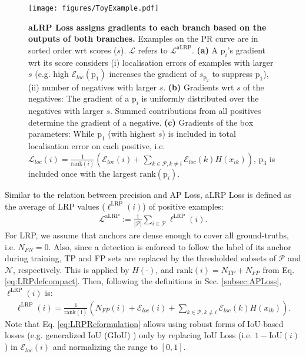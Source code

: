\documentclass{article}
\begin{document}
\begin{figure}[t]
    \centerline{
        \texttt{[image: figures/ToyExample.pdf]}
    }
    \caption{\textbf{aLRP Loss assigns gradients to each branch based on the outputs of both branches.} Examples on the PR curve are in sorted order wrt scores ($s$). $\mathcal{L}$ refers to $\mathcal{L}^\mathrm{aLRP}$. \textbf{(a)} A $\mathrm{p}_i$'s gradient wrt its score considers (i) localisation errors of  examples with larger $s$ (e.g. high $\mathcal{E}_{loc}(\mathrm{p_1})$ increases the gradient of $s_{\mathrm{p_2}}$ to suppress  $\mathrm{p_1}$), (ii) number of negatives with larger $s$. \textbf{(b)} Gradients wrt $s$ of the negatives: The gradient of a $\mathrm{p}_i$ is uniformly distributed over the negatives with larger $s$. Summed  contributions from all positives determine the gradient of a negative. \textbf{(c)} Gradients of the box parameters: While $\mathrm{p_1}$ (with highest $s$) is included in total localisation error on each positive, i.e. $\mathcal{L}_{loc}(i)=\frac{1}{\mathrm{rank}(i)} (  \mathcal{E}_{loc}(i) +\sum \limits_{k \in \mathcal{P}, k \neq i}  \mathcal{E}_{loc}(k) H(x_{ik}))$,  $\mathrm{p_3}$ is included once with the largest $\mathrm{rank}(\mathrm{p}_i)$.
    \label{fig:ToyExample}
} 
\end{figure}

Similar to the relation between precision and AP Loss, aLRP Loss is defined as the average of LRP values ($\ell^{\mathrm{LRP}}(i)$) of positive examples:
\begin{align}
\label{eq:aLRPLoss}
    \mathcal{L}^\mathrm{aLRP}:=\frac{1}{|\mathcal{P}|}\sum \limits_{i \in \mathcal{P}} \ell^{\mathrm{LRP}}(i) 
.
\end{align}
For LRP, we assume that anchors are dense enough to cover all ground-truths, i.e. $N_{FN}=0$. Also, since a detection is enforced to follow the label of its anchor during training, TP and FP sets are replaced by the thresholded subsets of $\mathcal{P}$ and $\mathcal{N}$,  respectively. This is applied by $H(\cdot)$, and $\mathrm{rank}(i)=N_{TP}+N_{FP}$ from Eq. \eqref{eq:LRPdefcompact}. Then, following the definitions in Sec. \ref{subsec:APLoss}, $\ell^{\mathrm{LRP}}(i)$ is:
\begin{align}
\label{eq:LRPReformulation}
    \ell^{\mathrm{LRP}}(i) 
= \frac{1}{\mathrm{rank(i)}}
    \left(N_{FP}(i) + \mathcal{E}_{loc}(i) +  \sum \limits_{k \in \mathcal{P}, k \neq i}  \mathcal{E}_{loc}(k) H(x_{ik}) \right).
\end{align}
Note that Eq. \eqref{eq:LRPReformulation}  allows using robust forms of IoU-based  losses (e.g. generalized IoU (GIoU) \cite{GIoULoss}) only by replacing IoU Loss (i.e. $1- \mathrm{IoU}(i)$) in $\mathcal{E}_{loc}(i)$ and normalizing the range to $[0,1]$.
\end{document}
